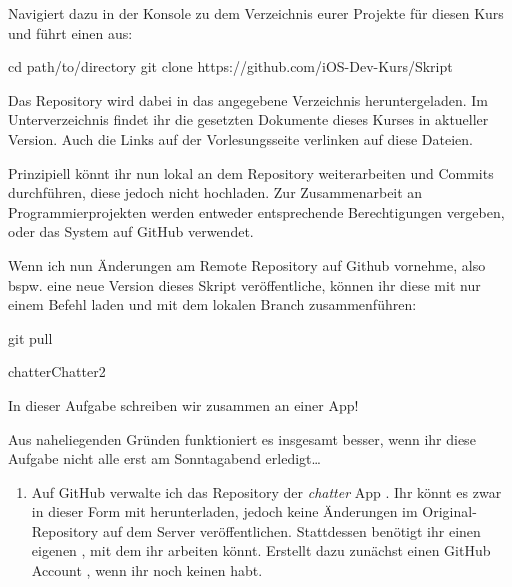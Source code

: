\documentclass[parskip=half, final]{scrreprt}
\begin{document}
\begin{lecture}
\begin{enumerate}
Navigiert dazu in der Konsole zu dem Verzeichnis eurer Projekte für diesen Kurs und führt einen  aus:

\begin{shcode}
cd path/to/directory
git clone https://github.com/iOS-Dev-Kurs/Skript
\end{shcode}

Das Repository wird dabei in das angegebene Verzeichnis heruntergeladen. Im Unterverzeichnis  findet ihr die gesetzten Dokumente dieses Kurses in aktueller Version. Auch die Links auf der Vorlesungsseite verlinken auf diese Dateien.

Prinzipiell könnt ihr nun lokal an dem Repository weiterarbeiten und Commits durchführen, diese jedoch nicht hochladen. Zur Zusammenarbeit an Programmierprojekten werden entweder entsprechende Berechtigungen vergeben, oder das  System auf GitHub verwendet.

Wenn ich nun Änderungen am Remote Repository auf Github vornehme, also bspw. eine neue Version dieses Skript veröffentliche, können ihr diese mit nur einem Befehl laden und mit dem lokalen  Branch zusammenführen:

\begin{shcode}
git pull
\end{shcode}

\end{enumerate}

\begin{exc}

\begin{excitem}{chatter}{Chatter}{2}

In dieser Aufgabe schreiben wir zusammen an einer App!

\begin{exchinweis}
Aus naheliegenden Gründen funktioniert es insgesamt besser, wenn ihr diese Aufgabe nicht alle erst am Sonntagabend erledigt…
\end{exchinweis}

\begin{enumerate}[label=\roman*.]

\item Auf GitHub verwalte ich das Repository der \emph{chatter} App . Ihr könnt es zwar in dieser Form mit  herunterladen, jedoch keine Änderungen im Original-Repository auf dem Server veröffentlichen. Stattdessen benötigt ihr einen eigenen , mit dem ihr arbeiten könnt. Erstellt dazu zunächst einen GitHub Account , wenn ihr noch keinen habt.


\end{enumerate}
\end{excitem}
\end{exc}
\end{lecture}
\end{document}
